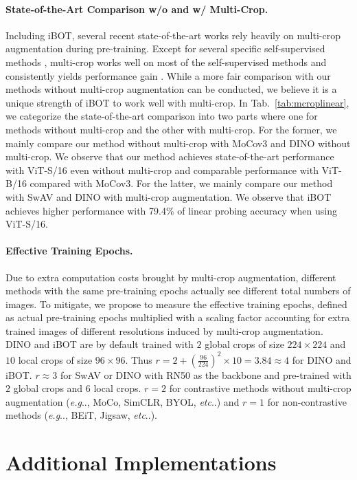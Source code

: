 \documentclass{article} %
\makeatletter
\def\ourmethod{{iBOT}\xspace}
\DeclareRobustCommand\onedot{\futurelet\@let@token\@onedot}
\def\@onedot{\ifx\@let@token.\else.\null\fi\xspace}
\def\eg{\emph{e.g}\onedot} \def\Eg{\emph{E.g}\onedot}
\def\etc{\emph{etc}\onedot} \def\vs{\emph{vs}\onedot}
\makeatother
\begin{document}
\paragraph{State-of-the-Art Comparison w/o and w/ Multi-Crop.} Including \ourmethod, several recent state-of-the-art works \citep{dino,swav} rely heavily on multi-crop augmentation during pre-training. Except for several specific self-supervised methods \citep{byol}, multi-crop works well on most of the self-supervised methods and consistently yields performance gain \citep{dino}. While a more fair comparison with our methods without multi-crop augmentation can be conducted, we believe it is a unique strength of \ourmethod to work well with multi-crop. In Tab.~\ref{tab:mcroplinear}, we categorize the state-of-the-art comparison into two parts where one for methods without multi-crop and the other with multi-crop. For the former, we mainly compare our method without multi-crop with MoCov3 \citep{mocov3} and DINO without multi-crop. We observe that our method achieves state-of-the-art performance with ViT-S/16 even without multi-crop and comparable performance with ViT-B/16 compared with MoCov3. For the latter, we mainly compare our method with SwAV \citep{swav} and DINO with multi-crop augmentation. We observe that \ourmethod achieves higher performance with 79.4\% of linear probing accuracy when using ViT-S/16.

\paragraph{Effective Training Epochs.}
Due to extra computation costs brought by multi-crop augmentation, different methods with the same pre-training epochs actually see different total numbers of images. To mitigate, we propose to measure the effective training epochs, defined as actual pre-training epochs multiplied with a scaling factor accounting for extra trained images of different resolutions induced by multi-crop augmentation. DINO and \ourmethod are by default trained with $2$ global crops of size $224 \times 224$ and $10$ local crops of size $96 \times 96$. Thus $r=2 + (\frac{96}{224})^2 \times 10=3.84\approx4$ for DINO and \ourmethod. $r\approx3$ for SwAV or DINO with RN50 as the backbone and pre-trained with $2$ global crops and $6$ local crops. $r=2$ for contrastive methods without multi-crop augmentation (\eg, MoCo, SimCLR, BYOL, \etc) and $r=1$ for non-contrastive methods (\eg, BEiT, Jigsaw, \etc).

\section{Additional Implementations}
\label{sec:addimplement}
\end{document}
